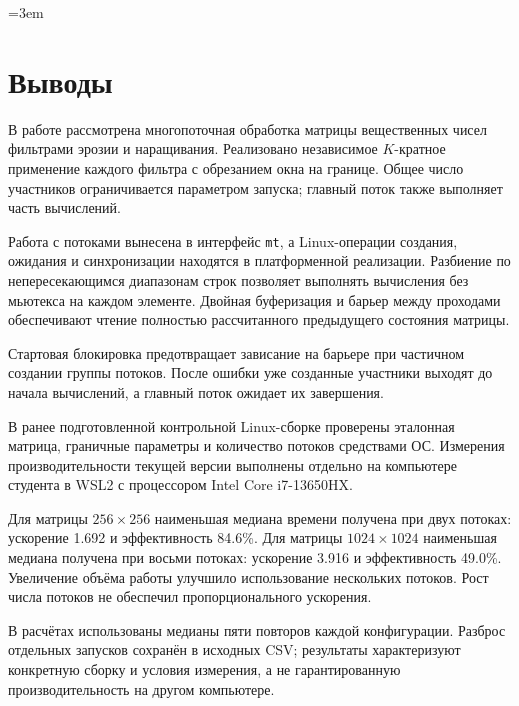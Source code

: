 \begingroup
\emergencystretch=3em
\section{Выводы}
В работе рассмотрена многопоточная обработка матрицы вещественных
чисел фильтрами эрозии и наращивания. Реализовано независимое
\(K\)-кратное применение каждого фильтра с обрезанием окна на границе.
Общее число участников ограничивается параметром запуска;
главный поток также выполняет часть вычислений.

Работа с потоками вынесена в интерфейс \texttt{mt}, а Linux-операции
создания, ожидания и синхронизации находятся в платформенной реализации.
Разбиение по непересекающимся диапазонам строк позволяет выполнять
вычисления без мьютекса на каждом элементе. Двойная буферизация
и барьер между проходами обеспечивают чтение полностью рассчитанного
предыдущего состояния матрицы.

Стартовая блокировка предотвращает зависание на барьере при частичном
создании группы потоков. После ошибки уже созданные участники выходят
до начала вычислений, а главный поток ожидает их завершения.

В ранее подготовленной контрольной Linux-сборке проверены эталонная
матрица, граничные параметры и количество потоков средствами ОС.
Измерения производительности текущей версии выполнены отдельно
на компьютере студента в WSL2 с процессором Intel Core i7-13650HX.

Для матрицы \(256\times256\) наименьшая медиана времени получена
при двух потоках: ускорение 1.692 и эффективность 84.6\%.
Для матрицы \(1024\times1024\) наименьшая медиана получена
при восьми потоках: ускорение 3.916 и эффективность 49.0\%.
Увеличение объёма работы улучшило использование нескольких потоков.
Рост числа потоков не обеспечил пропорционального ускорения.

В расчётах использованы медианы пяти повторов каждой конфигурации.
Разброс отдельных запусков сохранён в исходных CSV; результаты
характеризуют конкретную сборку и условия измерения, а не гарантированную
производительность на другом компьютере.
\clearpage
\endgroup
